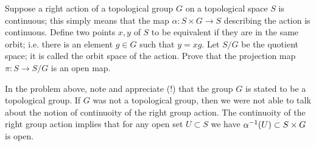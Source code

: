 \begin{problem}
	\label{prob:orbitSpace}
	Suppose a right action of a topological group $ G $ on a topological space $ S $ is continuous; this simply means that the map $ \alpha : S\times G \to S $ describing the action is continuous. Define two points $ x,y $ of $ S $ to be equivalent if they are in the same orbit; i.e. there is an element $ g \in G $ such that $ y = xg $. Let $ S/G $ be the quotient space; it is called the orbit space of the action. Prove that the projection map $ \pi: S \to S/G $  is an open map.
\end{problem}

\begin{observation}
	In the problem above, note and appreciate (!) that the group $ G $ is stated to be a topological group. If $ G $ was not a topological group, then we were not able to talk about the notion of continuoity of the right group action. The continuoity of the right group action implies that for any open set $ U \subset S $ we have $ \alpha^{-1}(U) \subset S\times G $ is open.
\end{observation}

